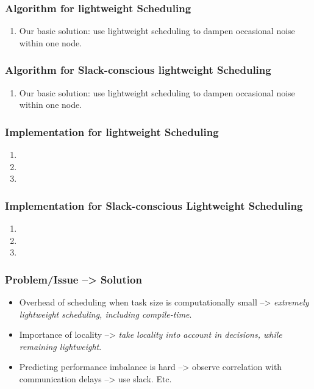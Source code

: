 \begin{frame}
\frametitle{Algorithm for lightweight Scheduling} 
\begin{enumerate} 
\item \small Our basic solution: use lightweight scheduling to dampen
  occasional noise within one node. 
\end{enumerate} 
\end{frame} 

\begin{frame} 
\frametitle{Algorithm for Slack-conscious lightweight Scheduling} 
\begin{enumerate} 
\item \small Our basic solution: use lightweight scheduling to dampen
  occasional noise within one node. 
\end{enumerate} 
\end{frame} 

\begin{frame}
\frametitle{Implementation for lightweight Scheduling} 
\begin{enumerate} 
\item \small 
\item \small 
\item \small 
\end{enumerate} 
\end{frame} 

\begin{frame}
\frametitle{Implementation for Slack-conscious Lightweight Scheduling} 
\begin{enumerate} 
\item \small 
\item \small 
\item \small 
\end{enumerate} 
\end{frame} 

\begin{frame}
\frametitle{Problem/Issue --> Solution}
\begin{itemize}
\item \small Overhead of scheduling when task size is computationally
  small --> \textit{extremely lightweight scheduling, including compile-time}. 
\item \small  Importance of locality --> \textit{take locality into account in
  decisions, while remaining lightweight}.
\item \small Predicting performance imbalance is hard --> observe
  correlation with communication delays --> use slack. Etc.  
\end{itemize} 
\end{frame}


